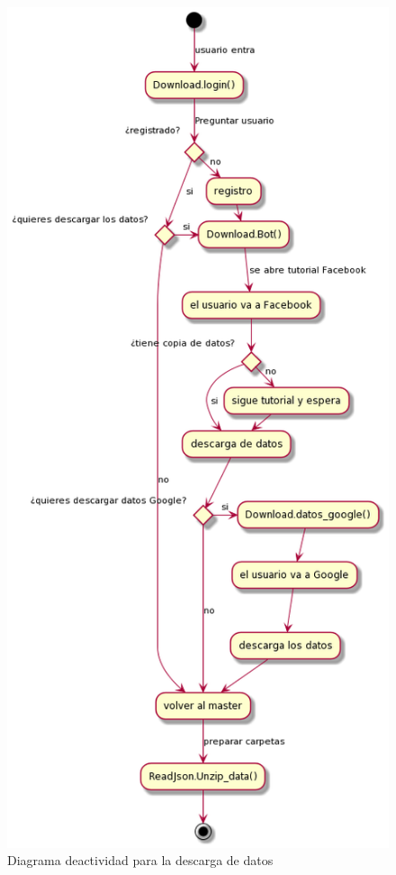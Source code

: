 \begin{figure}
	\includegraphics[scale=0.55]{Imagenes/Fuentes/Diagrama_actividad_descarga.png}
	\caption{Diagrama deactividad para la descarga de datos}
	\label{DiagramaDescarga}
\end{figure}


